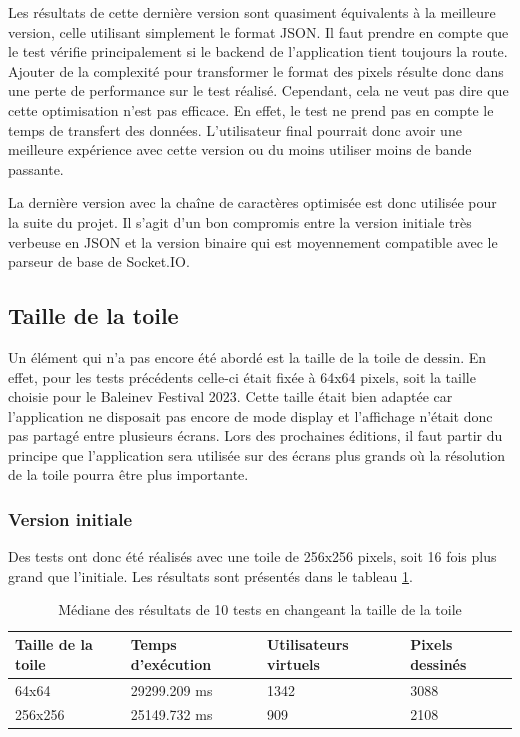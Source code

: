 Les résultats de cette dernière version sont quasiment équivalents à la meilleure version, celle utilisant simplement le format JSON. Il faut prendre en compte que le test vérifie principalement si le backend de l'application tient toujours la route. Ajouter de la complexité pour transformer le format des pixels résulte donc dans une perte de performance sur le test réalisé. Cependant, cela ne veut pas dire que cette optimisation n'est pas efficace. En effet, le test ne prend pas en compte le temps de transfert des données. L'utilisateur final pourrait donc avoir une meilleure expérience avec cette version ou du moins utiliser moins de bande passante.

La dernière version avec la chaîne de caractères optimisée est donc utilisée pour la suite du projet. Il s'agit d'un bon compromis entre la version initiale très verbeuse en JSON et la version binaire qui est moyennement compatible avec le parseur de base de Socket.IO.

\subsection{Taille de la toile}

Un élément qui n'a pas encore été abordé est la taille de la toile de dessin. En effet, pour les tests précédents celle-ci était fixée à 64x64 pixels, soit la taille choisie pour le Baleinev Festival 2023. Cette taille était bien adaptée car l'application ne disposait pas encore de mode display et l'affichage n'était donc pas partagé entre plusieurs écrans. Lors des prochaines éditions, il faut partir du principe que l'application sera utilisée sur des écrans plus grands où la résolution de la toile pourra être plus importante.

\subsubsection{Version initiale}

Des tests ont donc été réalisés avec une toile de 256x256 pixels, soit 16 fois plus grand que l'initiale. Les résultats sont présentés dans le tableau \ref{table:canvas-size-results}.

\begin{table}[H]
  \centering
  \begin{tabular}{|l|l|l|l|}
    \hline
    \textbf{Taille de la toile} & \textbf{Temps d'exécution} & \textbf{Utilisateurs virtuels} & \textbf{Pixels dessinés} \\ \hline
    64x64                       & 29299.209 ms               & 1342                           & 3088                     \\ \hline
    256x256                     & 25149.732 ms               & 909                            & 2108                     \\ \hline
  \end{tabular}
  \caption{Médiane des résultats de 10 tests en changeant la taille de la toile}
  \label{table:canvas-size-results}
\end{table}

